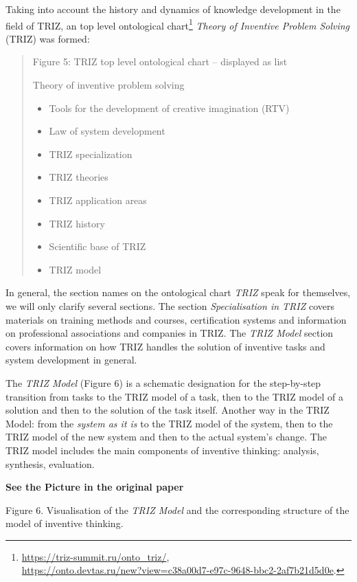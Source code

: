 \documentclass[11pt,a4paper]{article}
\newcommand{\addpicture}{\textbf{See the Picture in the original paper}\par}
\begin{document}
Taking into account the history and dynamics of knowledge development in the
field of TRIZ, an top level ontological
chart\footnote{\url{https://triz-summit.ru/onto_triz/},\\ \url{https://onto.devtas.ru/new?view=c38a00d7-e97c-9648-bbc2-2af7b21d5d0e}. }
\emph{Theory of Inventive Problem Solving} (TRIZ) was formed:
\begin{quote}
  Figure 5: TRIZ top level ontological chart -- displayed as list

  Theory of inventive problem solving
  \begin{itemize}[noitemsep]
  \item Tools for the development of creative imagination (RTV)
  \item Law of system development
  \item TRIZ specialization
  \item TRIZ theories
  \item TRIZ application areas
  \item TRIZ history
  \item Scientific base of TRIZ
  \item TRIZ model
  \end{itemize}
\end{quote}
In general, the section names on the ontological chart \emph{TRIZ} speak for
themselves, we will only clarify several sections. The section
\emph{Specialisation in TRIZ} covers materials on training methods and
courses, certification systems and information on professional associations
and companies in TRIZ. The \emph{TRIZ Model} section covers information on how
TRIZ handles the solution of inventive tasks and system development in
general.

The \emph{TRIZ Model} (Figure 6) is a schematic designation for the
step-by-step transition from tasks to the TRIZ model of a task, then to the
TRIZ model of a solution and then to the solution of the task itself.  Another
way in the TRIZ Model: from the \emph{system as it is} to the TRIZ model of
the system, then to the TRIZ model of the new system and then to the actual
system's change.  The TRIZ model includes the main components of inventive
thinking: analysis, synthesis, evaluation.

\begin{center}
  \addpicture
  Figure 6. Visualisation of the \emph{TRIZ Model} and the corresponding 
  structure of the model of inventive thinking.
\end{center}
\end{document}
